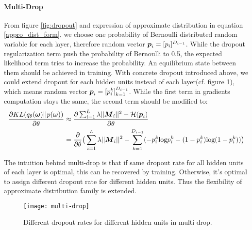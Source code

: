 \paragraph{Multi-Drop}
From figure \ref{fig:dropout} and expression of approximate distribution in equation \ref{appro_dist_form}, we choose one probability of Bernoulli distributed random variable for each layer, therefore random vector $\boldsymbol p_i = [p_i]^{D_{i-1}}$. While the dropout regularization term push the probability of Bernoulli to 0.5, the expected likelihood term tries to increase the probability. An equilibrium state between them should be achieved in training. With concrete dropout introduced above, we could extend dropout for each hidden units instead of each layer(cf. figure \ref{fig:multi-drop}), which means random vector $\boldsymbol p_i = [p_i^k]_{k=1}^{D_{i-1}}$. While the first term in gradients computation stays the same, the second term should be modified to:
\begin{equation} 
\begin{aligned}\label{KL_grad_multi}
\frac{\partial KL(q_{\theta}(\boldsymbol \omega)||p(\boldsymbol \omega))}{\partial \theta} 
&\approx \frac{\partial \sum_{i=1}^{L}\lambda||\boldsymbol M_{i}||^{2}- \mathcal H(\boldsymbol p_{i})}{\partial \theta}  \\
&= \frac{\partial}{\partial \theta} \big( \sum_{i=1}^{L}\lambda||\boldsymbol M_{i}||^{2}- \sum_{k=1}^{D_{i-1}}(-p_i^k\text{log}p_i^k - (1-p_i^k)\text{log}(1-p_i^k))\big)
\end{aligned}
\end{equation}  

The intuition behind multi-drop is that if same dropout rate for all hidden units of each layer is optimal, this can be recovered by training. Otherwise, it's optimal to assign different dropout rate for different hidden units. Thus the flexibility of approximate distribution family is extended.  

\begin{figure}[h!]
	\begin{center}
		\texttt{[image: multi-drop]}
		\caption{Different dropout rates for different hidden units in multi-drop.}		
		\label{fig:multi-drop}
	\end{center}
\end{figure}

\newpage
